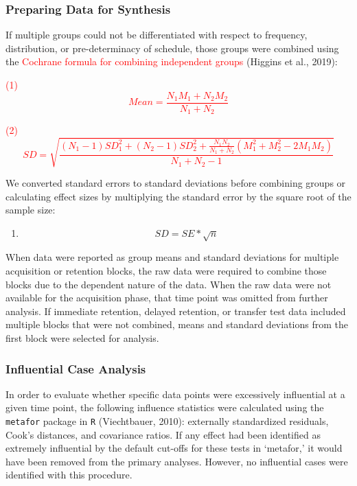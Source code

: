 \documentclass[
  english,
  man, donotrepeattitle,mask,floatsintext]{apa7}
\providecommand{\tightlist}{%
  \setlength{\itemsep}{0pt}\setlength{\parskip}{0pt}}
\begin{document}
\hypertarget{preparing-data-for-synthesis}{%
\subsubsection{Preparing Data for Synthesis}\label{preparing-data-for-synthesis}}

If multiple groups could not be differentiated with respect to frequency, distribution, or pre-determinacy of schedule, those groups were combined using the \textcolor{red}{Cochrane formula for combining independent groups} (Higgins et al., 2019):

\textcolor{red}{(1) $$ Mean = \frac{N_1M_1 + N_2M_2}{N_1 + N_2} $$}

\textcolor{red}{(2) $$ SD = \sqrt{\frac{(N_1 - 1)SD_1^2 + (N_2 - 1)SD_2^2 + \frac{N_1N_2}{N_1 + N_2}(M_1^2 + M_2^2 - 2M_1M_2)}{N_1 + N_2 - 1}} $$}

We converted standard errors to standard deviations before combining groups or calculating effect sizes by multiplying the standard error by the square root of the sample size:

\begin{enumerate}
\def\labelenumi{(\arabic{enumi})}
\setcounter{enumi}{2}
\tightlist
\item
  \[SD  = SE*\sqrt{n}\]
\end{enumerate}

When data were reported as group means and standard deviations for multiple acquisition or retention blocks, the raw data were required to combine those blocks due to the dependent nature of the data. When the raw data were not available for the acquisition phase, that time point was omitted from further analysis. If immediate retention, delayed retention, or transfer test data included multiple blocks that were not combined, means and standard deviations from the first block were selected for analysis.

\hypertarget{influential-case-analysis}{%
\subsubsection{Influential Case Analysis}\label{influential-case-analysis}}

In order to evaluate whether specific data points were excessively influential at a given time point, the following influence statistics were calculated using the \texttt{metafor} package in \texttt{R} (Viechtbauer, 2010): externally standardized residuals, Cook's distances, and covariance ratios. If any effect had been identified as extremely influential by the default cut-offs for these tests in `metafor,' it would have been removed from the primary analyses. However, no influential cases were identified with this procedure.
\end{document}
